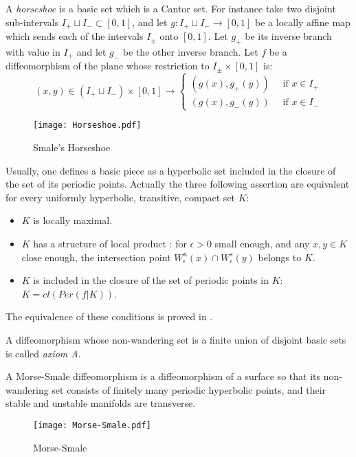 \documentclass[11pt,openany,leqno]{article}
\begin{document}
\begin{exam}[Horseshoe] 
A \emph{horseshoe} is a basic set which is a Cantor set. 
For instance take two disjoint sub-intervals $I_+\sqcup I_- \subset [0,1]$, and let $g \colon I_+\sqcup I_-  \to [0,1]$ be a locally affine map which sends each of the intervals $I_\pm$  onto $[0,1]$.  Let $g_+$ be its inverse branch with value in $I_+$ and let $g_-$ be the other inverse branch. 
Let $f$ be a diffeomorphism of the plane whose restriction to $I_\pm \times [0,1]$ is:
\[(x,y)\in  (I_+\sqcup I_-) \times [0,1] \to 
\left\{ \begin{array}{c}
(g(x),g_+(y)) \quad \text{ if }x\in I_+\\
(g(x),g_-(y)) \quad \text{ if }x\in I_-\end{array}\right.\]
\begin{figure}[h!]
		\centering
			\texttt{[image: Horseshoe.pdf]}
		\caption{Smale's Horseshoe}
	\end{figure}
\end{exam}

\begin{rema} 
Usually, one defines a basic piece as a hyperbolic set included in the closure of the set of its periodic points. Actually the three following assertion are equivalent for every uniformly hyperbolic, transitive, compact set $K$:
\begin{itemize}
\item  $K$ is locally maximal.
\item $K$ has a structure of local product : for $\epsilon>0$ small enough, and any $x,y\in K$ close enough, the intersection point $W^u_{\epsilon} (x)\cap W^s_{\epsilon} (y)$ belongs to $K$.
\item $K$ is included in the closure of the set of periodic points in $K$: $K= cl(Per(f|K))$. 
\end{itemize}
The equivalence of these conditions is proved in \cite{shubstab78}.
\end{rema}





\begin{defi}[Axiom A] A diffeomorphism whose non-wandering set is a finite union of disjoint  basic sets is called   \emph{axiom A}.
 \end{defi}
 
 \bigskip
 \begin{exam} 
A  Morse-Smale diffeomorphism is a diffeomorphism of a surface so that its non-wandering set consists of finitely many periodic hyperbolic points, and their  stable and unstable manifolds are transverse.
\begin{figure}[h!]
	\centering
		\texttt{[image: Morse-Smale.pdf]}
	\caption{Morse-Smale}
\end{figure}
 \end{exam}
\end{document}
